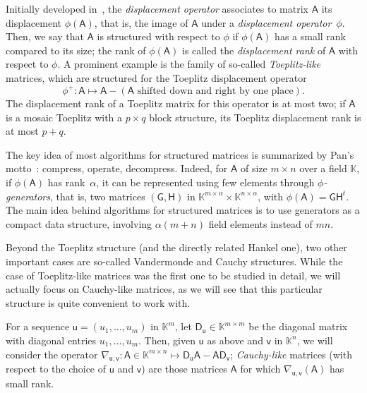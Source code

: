 \documentclass{sig-alternate}
\newcommand{\vu}{\ensuremath{\mathsf{u}}}
\newcommand{\vv}{\ensuremath{\mathsf{v}}}
\newcommand{\mA}{\ensuremath{\mathsf{A}}}
\newcommand{\mD}{\ensuremath{\mathsf{D}}}
\newcommand{\mG}{\ensuremath{\mathsf{G}}}
\newcommand{\mH}{\ensuremath{\mathsf{H}}}
\newcommand{\K}{\ensuremath{\mathbb{K}}}
\begin{document}
\smallskip{}  Initially developed
in~\cite{KaKuMo79}, the {\it displacement operator} associates to
matrix $\mA$ its displacement $\phi(\mA)$, that is, the image of $\mA$
under a \textit{displacement operator}~$\phi$.  Then, we say that
$\mA$ is structured with respect to $\phi$ if $\phi(\mA)$ has a small
rank compared to its size; the rank of $\phi(\mA)$ is called the
\textit{displacement rank} of $\mA$ with respect to $\phi$. A
prominent example is the family of so-called {\em Toeplitz-like}
matrices, which are structured for the Toeplitz displacement operator
$$\phi^+: \mA \mapsto \mA - (\mA \text{~shifted down and right by one
  place}).$$ The displacement rank of a Toeplitz matrix for this
operator is at most two; if $\mA$ is a mosaic Toeplitz with a $p
\times q$ block structure, its Toeplitz displacement rank is at most
$p+q$.

The key idea of most algorithms for structured matrices is summarized
by Pan's motto~\cite{Pan01}: compress, operate, decompress. Indeed,
for $\mA$ of size $m \times n$ over a field $\K$, if $\phi(\mA)$ has
rank~$\alpha$, it can be represented using few elements through {\it
  $\phi$-generators}, that is, two matrices $(\mG,\mH)$ in $\K^{m\times
  \alpha} \times \K^{n\times \alpha}$, with $\phi(\mA) = \mG \mH^t$.
The main idea behind algorithms for structured matrices is to use 
generators as a compact data structure, involving $\alpha (m+n)$ field
elements instead of $mn$. 

\smallskip{}  Beyond the Toeplitz
structure (and the directly related Hankel one), two other important
cases are so-called Vandermonde and Cauchy structures. While the case
of Toeplitz-like matrices was the first one to be studied in detail,
we will actually focus on Cauchy-like matrices, as we will see that
this particular structure is quite convenient to work with.

For a sequence $\vu=(u_1,\dots,u_m)$ in $\K^m$, let $\mD_\vu \in
\K^{m\times m}$ be the diagonal matrix with diagonal entries
$u_1,\dots,u_m$. Then, given $\vu$ as above and $\vv$ in $\K^n$, we will
consider the operator $\nabla_{\vu,\vv}: \mA \in \K^{m\times n} \mapsto \mD_\vu
\mA - \mA \mD_\vv$; {\em Cauchy-like} matrices (with respect to the
choice of $\vu$ and $\vv$) are those matrices $\mA$ for which
$\nabla_{\vu,\vv}(\mA)$ has small rank.
\end{document}

